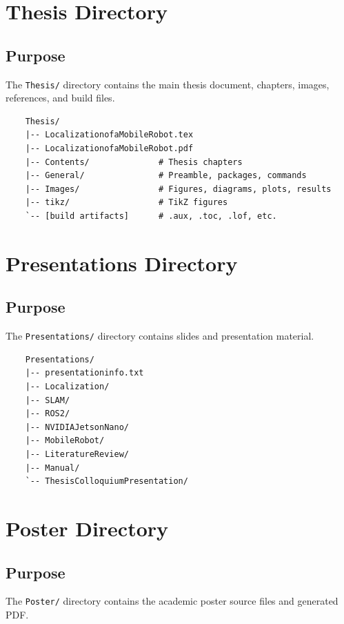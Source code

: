 \section{Thesis Directory}

\subsection{Purpose}

The \texttt{Thesis/} directory contains the main thesis document, chapters, images, references, and build files.

\begin{verbatim}
	Thesis/
	|-- LocalizationofaMobileRobot.tex
	|-- LocalizationofaMobileRobot.pdf
	|-- Contents/              # Thesis chapters
	|-- General/               # Preamble, packages, commands
	|-- Images/                # Figures, diagrams, plots, results
	|-- tikz/                  # TikZ figures
	`-- [build artifacts]      # .aux, .toc, .lof, etc.
\end{verbatim}

\section{Presentations Directory}

\subsection{Purpose}

The \texttt{Presentations/} directory contains slides and presentation material.

\begin{verbatim}
	Presentations/
	|-- presentationinfo.txt
	|-- Localization/
	|-- SLAM/
	|-- ROS2/
	|-- NVIDIAJetsonNano/
	|-- MobileRobot/
	|-- LiteratureReview/
	|-- Manual/
	`-- ThesisColloquiumPresentation/
\end{verbatim}

\section{Poster Directory}

\subsection{Purpose}

The \texttt{Poster/} directory contains the academic poster source files and generated PDF.

